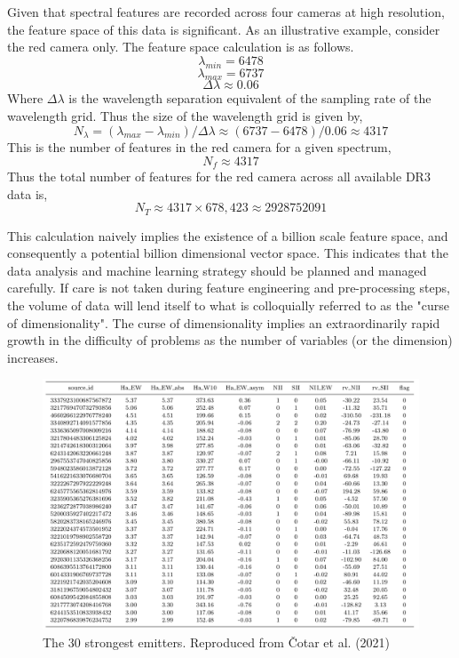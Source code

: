 Given that spectral features are recorded across four cameras at high resolution, the feature space of this data is significant. As an illustrative example, consider the red camera only. The feature space calculation is as follows.
\[\lambda_{min} = 6478\]
\[\lambda_{max} = 6737\]
\[\Delta\lambda \approx 0.06\]
Where $\Delta\lambda$ is the wavelength separation equivalent of the sampling rate of the wavelength grid. Thus the size of the wavelength grid is given by, \[N_{\lambda} = (\lambda_{max}-\lambda_{min})/\Delta\lambda \approx (6737-6478)/0.06 \approx 4317\]
This is the number of features in the red camera for a given spectrum, \[N_{f} \approx 4317\]
Thus the total number of features for the red camera across all available DR3 data is, \[N_{T} \approx 4317\times678,423 \approx \num[round-precision=2,round-mode=figures,
     scientific-notation=true]{2928752091}\]

This calculation naively implies the existence of a billion scale feature space, and consequently a potential billion dimensional vector space. This indicates that the data analysis and machine learning strategy should be planned and managed carefully. If care is not taken during feature engineering and pre-processing steps, the volume of data will lend itself to what is colloquially referred to as the "curse of dimensionality". The curse of dimensionality implies an extraordinarily rapid growth in the difficulty of problems as the number of variables (or the dimension) increases\cite{kuo2005lifting}.

\begin{figure}[!htb]
\centering
\includegraphics[scale=.45]{figures/cotartable.png}
\caption{The 30 strongest emitters. Reproduced from Čotar et al. (2021)\cite{vcotar2021galah}}
\end{figure}

